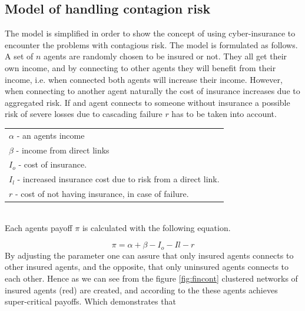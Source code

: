 \subsection{Model of handling contagion risk}
The model is simplified in order to show the concept of using cyber-insurance to encounter the problems with contagious risk. The model is formulated as follows. A set of $n$ agents are randomly chosen to be insured or not. They all get their own income, and by connecting to other agents they will benefit from their income, i.e. when connected both agents will increase their income. However, when connecting to another agent naturally the cost of insurance increases due to aggregated risk. If and agent connects to someone without insurance a possible risk of severe losses due to cascading failure $r$ has to be taken into account. 

\begin{tabular}{|l|}
  \hline
  $\alpha$ - an agents income\\
  $\beta$ - income from direct links \\
  $I_{o}$ - cost of insurance. \\
  $I_{l}$ - increased insurance cost due to risk from a direct link.\\
  $r$ - cost of not having insurance, in case of failure.\\
  \hline
\end{tabular} \\

Each agents payoff $ \pi$ is calculated with the following equation. 

\begin{equation}
  \pi = \alpha + \beta - I_{o} - I{l} - r 
 \label{eq:payoff}
\end{equation} 
By adjusting the parameter one can assure that only insured agents connects to other insured agents, and the opposite, that only uninsured agents connects to each other. Hence as we can see from the figure \ref{fig:fincont} clustered networks of insured agents (red) are created, and according to \cite{contagion} the these agents achieves super-critical payoffs. Which demonstrates that 


